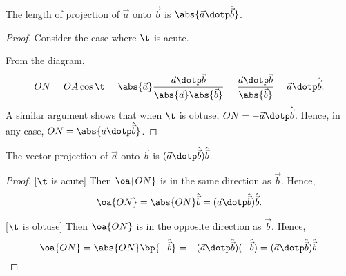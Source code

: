 \begin{proposition}
    The length of projection of $\vec a$ onto $\vec b$ is $\abs{\vec a \dotp \hat{\vec b}}$.
\end{proposition}
\begin{proof}
    Consider the case where $\t$ is acute.

    \begin{figure}[H]
        \centering
        \caption{\label{fig:336}}
    \end{figure}

    From the diagram, \[ON = OA \cos \t = \abs{\vec a} \frac{\vec a \dotp \vec b}{\abs{\vec a} \abs{\vec b}} = \frac{\vec a \dotp \vec b}{\abs{\vec b}} = \vec a \dotp \hat{\vec b}.\] A similar argument shows that when $\t$ is obtuse, $ON = -\vec a \dotp \hat{\vec b}$. Hence, in any case, $ON = \abs{\vec a \dotp \hat{\vec b}}$.
\end{proof}

\begin{proposition}
    The vector projection of $\vec a$ onto $\vec b$ is $(\vec a \dotp \hat{\vec b}) \hat{\vec b}$.
\end{proposition}
\begin{proof}
    [$\t$ is acute] Then $\oa{ON}$ is in the same direction as $\vec b$. Hence, \[\oa{ON} = \abs{ON} \hat{\vec b} = (\vec a \dotp \hat{\vec b}) \hat{\vec b}.\]

    [$\t$ is obtuse] Then $\oa{ON}$ is in the opposite direction as $\vec b$. Hence, \[\oa{ON} = \abs{ON} \bp{-\hat{\vec b}} = -(\vec a \dotp \hat{\vec b}) (-\hat{\vec b}) = (\vec a \dotp \hat{\vec b}) \hat{\vec b}.\]
\end{proof}

